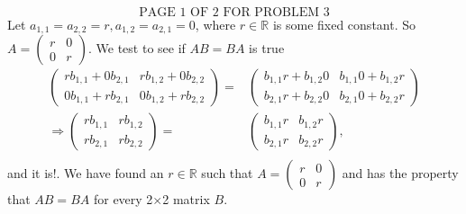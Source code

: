 \documentclass[12pt]{article}
\newenvironment{problem}[2][Problem]
{
	\begin{trivlist} 
		\item[\hskip \labelsep {\bfseries #1 #2:}]
	}
{
	\end{trivlist}
	}
\newenvironment{solution}[1][Solution]
{
	\begin{trivlist} 
		\item[\hskip \labelsep {\itshape #1:}]
	}
	{
	\end{trivlist}
}
\begin{document}
\begin{problem}{3}
\begin{solution}
\begin{align*}
\end{align*}
\[
\text{PAGE 1 OF 2 FOR PROBLEM 3}
\]
Let $a_{1,1}=a_{2,2}=r, a_{1,2}=a_{2,1}=0$, where $r\in \mathbb{R}$ is some fixed constant. So $A=\begin{pmatrix}r&0\\0&r\end{pmatrix}$. We test to see if $AB=BA$ is true
\begin{align*}
\begin{pmatrix} rb_{1,1} + 0b_{2,1} & rb_{1,2} + 0b_{2,2} \\ 0b_{1,1} + rb_{2,1} & 0b_{1,2} + rb_{2,2} \end{pmatrix} =& \begin{pmatrix} b_{1,1}r + b_{1,2}0 & b_{1,1}0 + b_{1,2}r \\ b_{2,1}r + b_{2,2}0 & b_{2,1}0 + b_{2,2}r \end{pmatrix}\\
\Rightarrow \begin{pmatrix} rb_{1,1} & rb_{1,2} \\ rb_{2,1} & rb_{2,2} \end{pmatrix} =& \begin{pmatrix} b_{1,1}r  &  b_{1,2}r \\ b_{2,1}r & b_{2,2}r \end{pmatrix} \text{,}\\
\end{align*}
and it is!. We have found an $r\in \mathbb{R}$ such that $A=\begin{pmatrix}r&0\\0&r\end{pmatrix}$ and has the property that $AB=BA$ for every  2$\times$2 matrix $B$.

\end{solution}
\end{problem}
\end{document}
